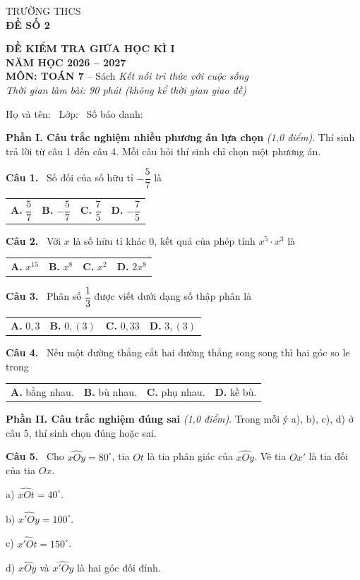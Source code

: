 \documentclass[12pt,a4paper]{article}
\makeatletter
\newcommand{\bonpa}[4]{\par\noindent\begin{tabularx}{\linewidth}{@{\hspace{0.6cm}}XXXX@{}}
\textbf{A.} #1 & \textbf{B.} #2 & \textbf{C.} #3 & \textbf{D.} #4\end{tabularx}\par}
\newcommand{\cau}[1]{\par\medskip\textbf{Câu #1.}~}
\newcommand{\y}[1]{\par\hspace*{0.6cm}#1}
\newcommand{\phan}[1]{\par\bigskip{\large\textbf{#1}}\par\smallskip}
\makeatother
\begin{document}
\noindent
\begin{minipage}[t]{0.38\linewidth}\centering
TRƯỜNG THCS \dotfill\\[2pt]
\textbf{ĐỀ SỐ 2}
\end{minipage}\hfill
\begin{minipage}[t]{0.6\linewidth}\centering
\textbf{ĐỀ KIỂM TRA GIỮA HỌC KÌ I}\\
\textbf{NĂM HỌC 2026 -- 2027}\\
\textbf{MÔN: TOÁN 7} -- Sách \textit{Kết nối tri thức với cuộc sống}\\
\textit{Thời gian làm bài: 90 phút (không kể thời gian giao đề)}
\end{minipage}

\medskip
Họ và tên: \dotfill\ Lớp: \makebox[2cm]{\dotfill}\ Số báo danh: \makebox[2.5cm]{\dotfill}
\phan{A. TRẮC NGHIỆM (3,0 điểm)}
\textbf{Phần I. Câu trắc nghiệm nhiều phương án lựa chọn} \textit{(1,0 điểm)}. Thí sinh trả lời từ câu 1 đến câu 4. Mỗi câu hỏi thí sinh chỉ chọn một phương án.
\cau{1} Số đối của số hữu tỉ $-\dfrac{5}{7}$ là
\bonpa{$\dfrac{5}{7}$}{$-\dfrac{5}{7}$}{$\dfrac{7}{5}$}{$-\dfrac{7}{5}$}
\cau{2} Với $x$ là số hữu tỉ khác $0$, kết quả của phép tính $x^{5}\cdot x^{3}$ là
\bonpa{$x^{15}$}{$x^{8}$}{$x^{2}$}{$2x^{8}$}
\cau{3} Phân số $\dfrac{1}{3}$ được viết dưới dạng số thập phân là
\bonpa{$0{,}3$}{$0{,}(3)$}{$0{,}33$}{$3{,}(3)$}
\cau{4} Nếu một đường thẳng cắt hai đường thẳng song song thì hai góc so le trong
\bonpa{bằng nhau.}{bù nhau.}{phụ nhau.}{kề bù.}

\medskip\textbf{Phần II. Câu trắc nghiệm đúng sai} \textit{(1,0 điểm)}. Trong mỗi ý a), b), c), d) ở câu 5, thí sinh chọn đúng hoặc sai.
\cau{5} Cho $\widehat{xOy}=80^\circ$, tia $Ot$ là tia phân giác của $\widehat{xOy}$. Vẽ tia $Ox'$ là tia đối của tia $Ox$.
\y{a) $\widehat{xOt}=40^\circ$.}
\y{b) $\widehat{x'Oy}=100^\circ$.}
\y{c) $\widehat{x'Ot}=150^\circ$.}
\y{d) $\widehat{xOy}$ và $\widehat{x'Oy}$ là hai góc đối đỉnh.}
\end{document}
